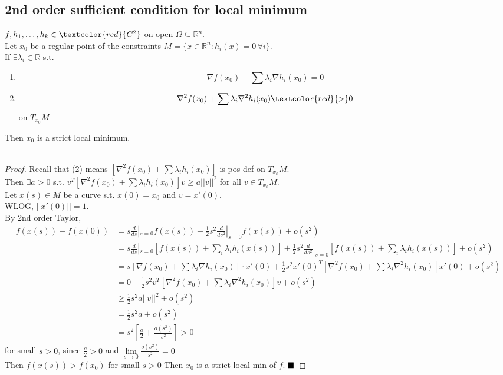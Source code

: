 \documentclass[11pt]{article}
\newcommand{\real}[0]{\mathbb{R}}
\newcommand{\qed}[0]{$\hfill\blacksquare$}
\newcommand{\tanspace}[0]{T_{x_0}M}
\begin{document}
\subsection{2nd order sufficient condition for local minimum}
$f, h_1, \hdots, h_k \in \textcolor{red}{C^2}$ on open $\Omega \subseteq \real^n$. \\
Let $x_0$ be a regular point of the constraints $ M = \{ x \in \real^n: h_i(x) = 0 \, \forall i\}$. \\
If $\exists \lambda_i \in \real$ s.t.
\begin{enumerate}
	\item $$ \nabla f(x_0) + \sum \lambda_i \nabla h_i(x_0) = 0$$
	\item $$ \nabla^2 f(x_0) + \sum \lambda_i \nabla^2 h_i(x_0) \textcolor{red}{>} 0$$ on $T_{x_0} M$
\end{enumerate}
Then $x_0$ is a strict local minimum.\\\\
\begin{proof}
	Recall that (2) means $[\nabla^2 f(x_0) + \sum \lambda_i h_i(x_0)]$ is pos-def on $T_{x_0}M$. \\
	Then $ \exists a > 0$ s.t. $v^T [\nabla^2 f(x_0) + \sum \lambda_i h_i(x_0)] v \geq a||v||^2$ for all $v \in \tanspace$. \\
	Let $x(s) \in M$ be a curve s.t. $x(0) = x_0$ and $v = x'(0)$. \\
	WLOG, $||x'(0)|| = 1$.\\
	By 2nd order Taylor, 
	\begin{align*}
		f(x(s)) - f(x(0)) &= s\frac{d}{ds}|_{s=0} f(x(s)) + \frac{1}{2} s^2 \frac{d}{ds^2} |_{s=0} f(x(s)) + o(s^2)\\
		&= s\frac{d}{ds}|_{s=0} [f(x(s)) + \sum_i \lambda_i h_i(x(s)) ]+ \frac{1}{2} s^2 \frac{d}{ds^2}|_{s=0} [f(x(s)) + \sum_i \lambda_i h_i(x(s)) ] + o(s^2) \tag{$\sum_i \lambda_i h_i(x(s)) = 0$}\\
		&=  s[\nabla f(x_0) + \sum \lambda_i \nabla h_i(x_0)] \cdot x'(0) + \frac{1}{2}s^2x'(0)^T[\nabla^2f(x_0) + \sum \lambda_i \nabla^2h_i(x_0)] x'(0) + o(s^2) \\
		&= 0 + \frac{1}{2} s^2 v^T[\nabla^2f(x_0) + \sum \lambda_i \nabla^2h_i(x_0)]v + o(s^2) \\
		&\geq \frac{1}{2}s^2 a||v||^2 + o(s^2) \\
		&= \frac{1}{2}s^2 a + o(s^2) \\
		&= s^2 [\frac{a}{2} + \frac{o(s^2)}{s^2}] > 0
	\end{align*}
	for small $s >0$, since $\frac{a}{2} > 0$ and $\underset{s \rightarrow 0}{\lim} \frac{o(s^2)}{s^2} = 0$ \\
	Then $f(x(s)) > f(x_0)$ for small $s > 0$
	Then $x_0$ is a strict local min of $f$. \qed
\end{proof}
\end{document}
